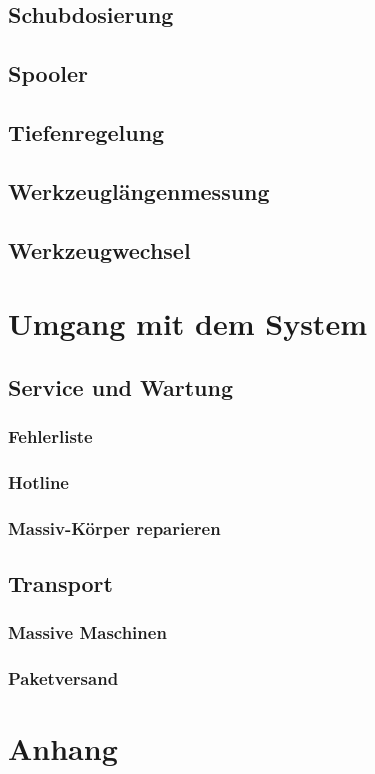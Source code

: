 \documentclass[a4paper]{book}
\begin{document}
	\section{Schubdosierung} 
	\section{Spooler} 
	\section{Tiefenregelung} 
	\section{Werkzeuglängenmessung} 
	\section{Werkzeugwechsel} 

\chapter{Umgang mit dem System}
	\section{Service und Wartung} 
		\subsection{Fehlerliste} 
		\subsection{Hotline} 
		\subsection{Massiv-Körper reparieren} 
	\section{Transport} 
		\subsection{Massive Maschinen} 
		\subsection{Paketversand} 
 
\chapter{Anhang}
\end{document}
